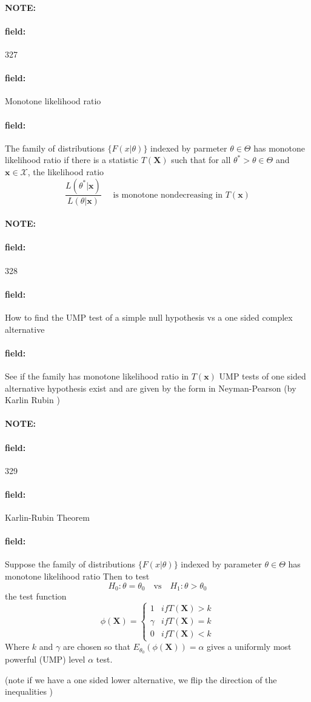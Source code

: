 \documentclass[12pt]{article}
\newenvironment{note}{\paragraph{NOTE:}}{}
\newenvironment{field}{\paragraph{field:}}{}
\begin{document}
\begin{note}
    \begin{field}
        \tiny 327
    \end{field}
    \begin{field}
        Monotone likelihood ratio
    \end{field}
    \begin{field}
        The family of distributions $\{F(x|\theta)\}$ indexed by parmeter $\theta \in \Theta$ has monotone likelihood ratio if there is a statistic $T(\mathbf{X})$ such that for all $\theta^* > \theta \in \Theta$ and $\mathbf{x} \in \mathscr{X}$, the likelihood ratio $$ \frac{L(\theta^*|\mathbf{x})}{L(\theta|\mathbf{x})} \quad \text{ is monotone nondecreasing in } T(\mathbf{x})$$
    \end{field}
\end{note}

\begin{note}
    \begin{field}
        \tiny 328
    \end{field}
    \begin{field}
        How to find the UMP test of a simple null hypothesis vs a one sided complex alternative
    \end{field}
    \begin{field}
        See if the family has monotone likelihood ratio in $T(\mathbf{x})$
        UMP tests of one sided alternative hypothesis exist and are given by the form in Neyman-Pearson (by Karlin Rubin )
    \end{field}
\end{note}

\begin{note}
    \begin{field}
        \tiny 329
    \end{field}
    \begin{field}
        Karlin-Rubin Theorem
    \end{field}
    \begin{field}
        Suppose the family of distributions $\{F(x|\theta)\}$ indexed by parameter $\theta \in \Theta$ has monotone likelihood ratio Then to test $$ H_0: \theta = \theta_0 \quad \text{vs} \quad H_1: \theta > \theta_0$$
         the test function
         \[
           \phi(\mathbf{X}) =
           \begin{cases}
                1 & if T(\mathbf{X}) > k  \\
                \gamma & if T(\mathbf{X}) = k\\
                0 & if T(\mathbf{X}) < k
           \end{cases}
         \]
         Where $k$ and $\gamma$ are chosen so that $E_{\theta_0}(\phi(\mathbf{X})) = \alpha$ gives a uniformly most powerful (UMP) level $\alpha$ test.

         (note if we have a one sided lower alternative, we flip the direction of the inequalities )
    \end{field}
\end{note}
\end{document}
